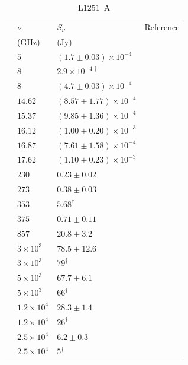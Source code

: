 \documentclass[9pt]{extarticle}   	%
\begin{document}
\begin{table}
\caption{L$1251$~A}
\begin{center}
\begin{tabular}{llll}
\hline
 & $\nu$ & $S_\nu$ & Reference\\
 & (GHz) & (Jy) & \\
\hline
 & $5$ & $(1.7\pm0.03)\times10^{-4}$ & \citet{2001AJ....121.1556B}\\
 & $8$ & $2.9\times10^{-4\dag}$ & \citet{2004AJ...127.1736R}\\
 & $8$ & $(4.7\pm0.03)\times10^{-4}$ & \citet{2001AJ....121.1556B}\\
 & $14.62$ & $(8.57\pm1.77)\times10^{-4}$ & \citet{2012MNRAS.423.1089A}\\
 & $15.37$ & $(9.85\pm1.36)\times10^{-4}$ & \citet{2012MNRAS.423.1089A}\\
 & $16.12$ & $(1.00\pm0.20)\times10^{-3}$ & \citet{2012MNRAS.423.1089A}\\
 & $16.87$ & $(7.61\pm1.58)\times10^{-4}$ & \citet{2012MNRAS.423.1089A}\\
 & $17.62$ & $(1.10\pm0.23)\times10^{-3}$ & \citet{2012MNRAS.423.1089A}\\
 & $230$ & $0.23\pm0.02$ & \citet{1995PASP..107...49R}\\
 & $273$ & $0.38\pm0.03$ & \citet{1995PASP..107...49R}\\
 & $353$ & $5.68^{\dag}$ & \citet{2008ApJS..175..277D}\\
 & $375$ & $0.71\pm0.11$ & \citet{1995PASP..107...49R}\\
 & $857$ & $20.8\pm3.2$ & \citet{2007AJ....133.1560W}\\
 & $3\times10^{3}$ & $78.5\pm12.6$ & \citet{1995PASP..107...49R}\\
 & $3\times10^{3}$ & $79^{\dag}$ & \citet{1989ApJ...343..773S}\\
 & $5\times10^{3}$ & $67.7\pm6.1$ & \citet{1995PASP..107...49R}\\
 & $5\times10^{3}$ & $66^{\dag}$ & \citet{1989ApJ...343..773S}\\
 & $1.2\times10^{4}$ & $28.3\pm1.4$ & \citet{1995PASP..107...49R}\\
 & $1.2\times10^{4}$ & $26^{\dag}$ & \citet{1989ApJ...343..773S}\\
 & $2.5\times10^{4}$ & $6.2\pm0.3$ & \citet{1995PASP..107...49R}\\
 & $2.5\times10^{4}$ & $5^{\dag}$ & \citet{1989ApJ...343..773S}\\
\end{tabular}
\end{center}
\label{default}
\end{table}%
\end{document}
